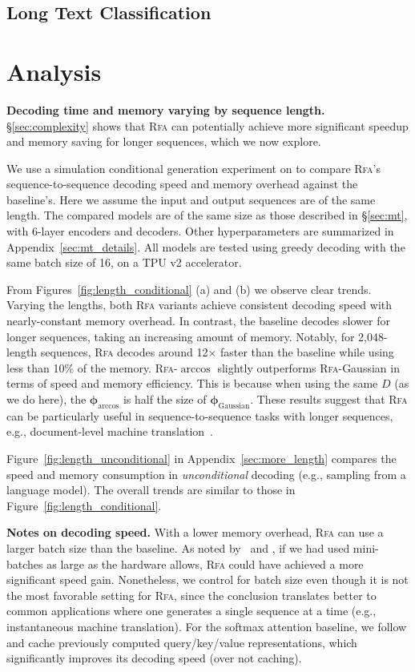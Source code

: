 {\subsection{Long Text Classification}}\label{sec:lra}

\section{Analysis}\label{sec:analysis}

\textbf{Decoding time and memory varying by sequence length.}
\S\ref{sec:complexity} shows that \textsc{Rfa} can potentially achieve more significant speedup and memory saving for longer sequences, which we now explore.

We use a simulation conditional generation experiment on to compare
\textsc{Rfa}'s sequence-to-sequence decoding speed and memory overhead against the baseline's. Here we assume the input and output sequences are of the same length. The compared models are of the same size as those described in \S\ref{sec:mt},
with 6-layer encoders and decoders. Other hyperparameters are summarized in Appendix~\ref{sec:mt_details}.
All models are tested using greedy decoding with the same batch size of 16, on a TPU v2 accelerator.

From Figures~\ref{fig:length_conditional} (a) and (b) we observe clear trends. Varying the lengths, both \textsc{Rfa} variants achieve consistent decoding speed with nearly-constant memory overhead. In contrast, the baseline decodes slower for longer sequences, taking an increasing amount of memory. Notably, for 2,048-length sequences,
\textsc{Rfa} decodes around 12$\times$ faster than the baseline while using less than 10\%
of the memory.
\textsc{Rfa}-$\arccos$ slightly outperforms \textsc{Rfa}-Gaussian in terms of speed and memory efficiency. This is because when using the same $D$ (as we do here), the $\boldsymbol{\phi}_{\arccos}$ is half the size of $\boldsymbol{\phi}_{\text{Gaussian}}$.
These results suggest that \textsc{Rfa} can be particularly useful in sequence-to-sequence tasks with longer sequences, e.g., document-level machine translation~\citep{miculicich2018document}.

Figure~\ref{fig:length_unconditional} in Appendix~\ref{sec:more_length}
compares the speed and memory consumption in \emph{unconditional} decoding (e.g., sampling from a language model). The overall trends are similar to those in Figure~\ref{fig:length_conditional}.

\textbf{Notes on decoding speed.} With a lower memory overhead, \textsc{Rfa} can use a larger batch size than the baseline. As noted by~\citet{katharopoulos20transformers} and \citet{kasai2020deep},
if we had used mini-batches as large as the hardware allows,
\textsc{Rfa} could have achieved a more significant speed gain. Nonetheless, we control for batch size even though it is not the most favorable setting for \textsc{Rfa}, 
since the conclusion translates better to common applications where one generates a single sequence at a time (e.g., instantaneous machine translation). For the softmax attention baseline, we follow \citet{ott2018scaling} and cache previously computed query/key/value representations, which significantly improves its decoding speed (over not caching).

